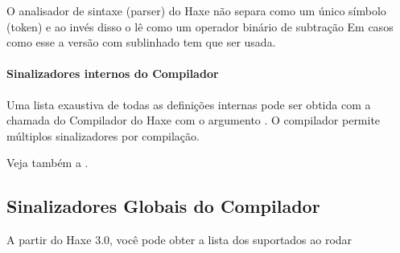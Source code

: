 O analisador de sintaxe (parser) do Haxe não separa  como um único símbolo (token) e ao invés disso o lê como um operador binário de subtração  Em casos como esse a versão com sublinhado  tem que ser usada.

\paragraph{Sinalizadores internos do Compilador}

Uma lista exaustiva de todas as definições internas pode ser obtida com a chamada do Compilador do Haxe com o argumento . O compilador permite múltiplos sinalizadores  por compilação.

Veja também a .
\subsection{Sinalizadores Globais do Compilador}
\label{lf-condition-compilation-flags}

A partir do Haxe 3.0, você pode obter a lista dos  suportados ao rodar 

